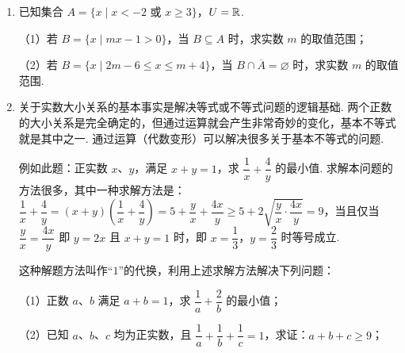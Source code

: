 \documentclass[a4paper,11pt]{article}
\begin{document}
\begin{enumerate}
\ansspace[6]

\item 已知集合 $A=\{x\mid x<-2\text{ 或 }x\geqslant3\}$，$U=\mathbb{R}$.

（1）若 $B=\{x\mid mx-1>0\}$，当 $B\subseteq A$ 时，求实数 $m$ 的取值范围；

（2）若 $B=\{x\mid2m-6\leqslant x\leqslant m+4\}$，当 $B\cap\overline A=\varnothing$ 时，求实数 $m$ 的取值范围.

\ifanswer
\solbegin
{}
\step{综上所述，实数 $m$ 的取值范围为 $(-\infty,-6)\cup\left[\dfrac92,+\infty\right)$.}
\solend
\fi

\ansspace[7]

\item 关于实数大小关系的基本事实是解决等式或不等式问题的逻辑基础. 两个正数的大小关系是完全确定的，但通过运算就会产生非常奇妙的变化，基本不等式就是其中之一. 通过运算（代数变形）可以解决很多关于基本不等式的问题.

例如此题：正实数 $x$、$y$，满足 $x+y=1$，求 $\dfrac1x+\dfrac4y$ 的最小值. 求解本问题的方法很多，其中一种求解方法是：$\dfrac1x+\dfrac4y=(x+y)\left(\dfrac1x+\dfrac4y\right)=5+\dfrac yx+\dfrac{4x}{y}\geqslant5+2\sqrt{\dfrac yx\cdot\dfrac{4x}{y}}=9$，当且仅当 $\dfrac yx=\dfrac{4x}{y}$ 即 $y=2x$ 且 $x+y=1$ 时，即 $x=\dfrac13$，$y=\dfrac23$ 时等号成立.

这种解题方法叫作“$1$”的代换，利用上述求解方法解决下列问题：

（1）正数 $a$、$b$ 满足 $a+b=1$，求 $\dfrac1a+\dfrac2b$ 的最小值；

（2）已知 $a$、$b$、$c$ 均为正实数，且 $\dfrac1a+\dfrac1b+\dfrac1c=1$，求证：$a+b+c\geqslant9$；


\end{enumerate}
\end{document}
